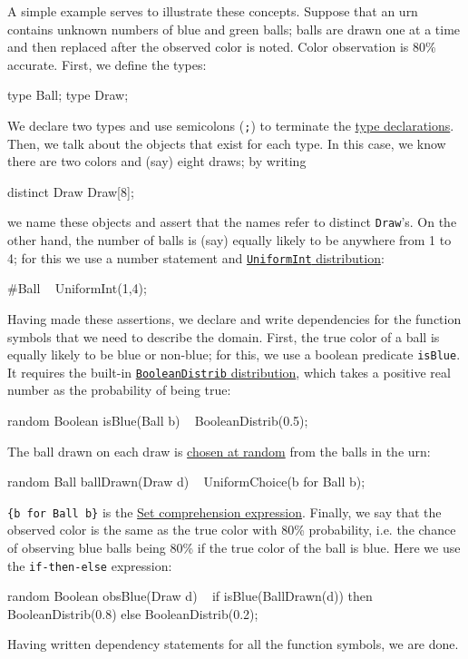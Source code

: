 \documentclass[12pt]{article}
\begin{document}
A simple example serves to illustrate these concepts. Suppose that an urn contains unknown numbers of blue and green balls;
balls are drawn one at a time and then replaced after the observed color is noted. Color observation is 80\% accurate.
First, we define the types:
\begin{blogcode}
type Ball; 
type Draw; 
\end{blogcode}
We declare two types and use semicolons (\verb|;|) to terminate the \hyperref[type-declaration-section]{type declarations}. 
Then, we talk about the objects that exist for each type.
In this case, we know there are two colors and (say) eight draws; by writing
\begin{blogcode}
distinct Draw Draw[8];
\end{blogcode}
we name these objects and assert that the names refer to distinct \verb|Draw|'s.
On the other hand, the number of balls is (say) equally likely to be anywhere from 1 to 4; for this we use a number statement and \hyperref[uniformint-section]{\texttt{UniformInt} distribution}:
\begin{blogcode}
#Ball ~ UniformInt(1,4);
\end{blogcode}
Having made these assertions, we declare and write dependencies for the function symbols
that we need to describe the domain. First, the true color of a ball is 
equally likely to be blue or non-blue; for this, we use a boolean predicate 
\verb|isBlue|. It requires the built-in \hyperref[boolean-distribution-section]{\texttt{BooleanDistrib} distribution}, which takes a positive real number as the probability of being true:
\begin{blogcode}
random Boolean isBlue(Ball b) ~ BooleanDistrib(0.5);
\end{blogcode}
The ball drawn on each draw is \hyperref[uniformchoice-section]{chosen at random} from the balls in the urn:
\begin{blogcode}
random Ball ballDrawn(Draw d) ~ UniformChoice({b for Ball b});
\end{blogcode}
\verb|{b for Ball b}| is the \hyperref[set-section]{Set comprehension expression}. 
Finally, we say that the observed color is the same as the true color
with 80\% probability, i.e. the chance of observing blue balls being 
80\% if the true color of the ball is blue.
Here we use the \verb|if-then-else| expression:
\begin{blogcode}
random Boolean obsBlue(Draw d) ~
  if isBlue(BallDrawn(d)) then 
    BooleanDistrib(0.8)
  else
    BooleanDistrib(0.2);
\end{blogcode}
Having written dependency statements for all the function symbols, we are done.
\end{document}
